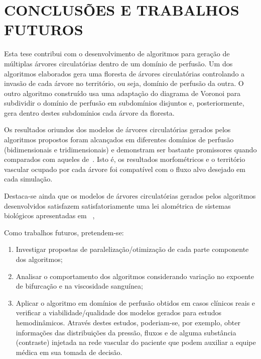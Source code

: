 \chapter{CONCLUSÕES E TRABALHOS FUTUROS} \label{conclusao}

Esta tese contribui com o desenvolvimento de algoritmos para geração de múltiplas árvores 
circulatórias dentro de um domínio de perfusão. Um dos algoritmos elaborados gera uma floresta de árvores 
circulatórias controlando a invasão de cada árvore no território, ou seja, domínio de perfusão da outra. O outro algoritmo construído usa uma adaptação do diagrama de Voronoi
para subdividir o domínio de perfusão em subdomínios disjuntos e, posteriormente,  gera
dentro destes subdomínios cada árvore da floresta.

Os resultados  oriundos dos modelos de árvores circulatórias gerados pelos algoritmos propostos foram alcançados em diferentes domínios de perfusão (bidimensionais  
e tridimensionais) e demonstram ser bastante promissores quando 
comparados com aqueles de~\cite{Jaquet2019,Karch1999}. Isto é, os resultados morfométricos 
e o território vascular ocupado por cada árvore foi compatível com o fluxo alvo
desejado em cada simulação.

Destaca-se ainda que os modelos de árvores circulatórias gerados pelos algoritmos desenvolvidos satisfazem satisfatoriamente uma lei alométrica de sistemas biológicos apresentadas em ~\cite{West1997},  

Como trabalhos futuros, pretendem-se:
\begin{enumerate}
  \item Investigar propostas de paralelização/otimização de cada parte componente dos algoritmos;
  \item Analisar o comportamento dos algoritmos considerando variação no expoente de bifurcação e na viscosidade sanguínea;
  \item Aplicar o algoritmo em domínios de perfusão obtidos em casos clínicos reais e 
  verificar a viabilidade/qualidade dos modelos gerados para estudos hemodinâmicos. Através destes estudos, poderiam-se, por exemplo, obter informações das distribuições da pressão, fluxos e  de alguma substância (contraste) injetada na rede vascular do paciente que podem auxiliar a equipe médica em sua tomada de decisão.
\end{enumerate}